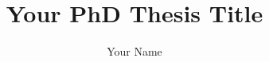 \documentclass[
  a4paper,
  12pt,
  numbers=noenddot,
  listof=totoc,
  toc=bibliography,
]{phdthesis}
\title{Your PhD Thesis Title}
\author{Your Name}
\begin{document}
\makecover
{}
\maketitle

\frontmatter
\begin{spacing}{1}
  
  \begin{otherlanguage}{german}
    
  \end{otherlanguage}
\end{spacing}


\tableofcontents
\mainmatter




\printbibliography
\listoffigures
\listoftables
\end{document}
